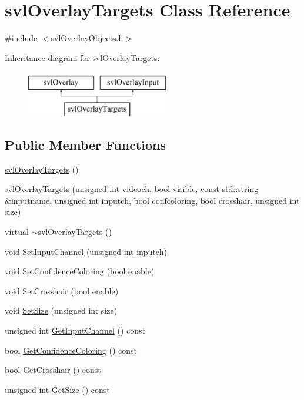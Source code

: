 \hypertarget{classsvl_overlay_targets}{}\section{svl\+Overlay\+Targets Class Reference}
\label{classsvl_overlay_targets}


{\ttfamily \#include $<$svl\+Overlay\+Objects.\+h$>$}

Inheritance diagram for svl\+Overlay\+Targets\+:\begin{figure}[H]
\begin{center}
\leavevmode
\includegraphics[height=2.000000cm]{de/ddd/classsvl_overlay_targets}
\end{center}
\end{figure}
\subsection*{Public Member Functions}
\begin{DoxyCompactItemize}
\item 
\hyperlink{classsvl_overlay_targets_a6b6e8c9a5cdecb2aad325ea153a31f1b}{svl\+Overlay\+Targets} ()
\item 
\hyperlink{classsvl_overlay_targets_ab078e446f8428b89fae2686e22e52f25}{svl\+Overlay\+Targets} (unsigned int videoch, bool visible, const std\+::string \&inputname, unsigned int inputch, bool confcoloring, bool crosshair, unsigned int size)
\item 
virtual \hyperlink{classsvl_overlay_targets_a9a99f9775bbafd54a56724be23599c00}{$\sim$svl\+Overlay\+Targets} ()
\item 
void \hyperlink{classsvl_overlay_targets_a549e6ce11739afc6acb5ad55c8220c94}{Set\+Input\+Channel} (unsigned int inputch)
\item 
void \hyperlink{classsvl_overlay_targets_a4dd5523a43ab40d1db86a6955f0ff51a}{Set\+Confidence\+Coloring} (bool enable)
\item 
void \hyperlink{classsvl_overlay_targets_a6429a90e95b48aefff5667daec18afa9}{Set\+Crosshair} (bool enable)
\item 
void \hyperlink{classsvl_overlay_targets_a447dd83b868670f5ee69943208f46083}{Set\+Size} (unsigned int size)
\item 
unsigned int \hyperlink{classsvl_overlay_targets_aef9aef75fa0166c7b2de1d29e6b5b9be}{Get\+Input\+Channel} () const 
\item 
bool \hyperlink{classsvl_overlay_targets_a1ae4aea0fdc8b9e5b028496d3507d6da}{Get\+Confidence\+Coloring} () const 
\item 
bool \hyperlink{classsvl_overlay_targets_a44dfc0e2dc64ee4b297f330bc1a5882c}{Get\+Crosshair} () const 
\item 
unsigned int \hyperlink{classsvl_overlay_targets_a639a0cebe0a0a5de5d2541df8db0f195}{Get\+Size} () const 
\end{DoxyCompactItemize}
